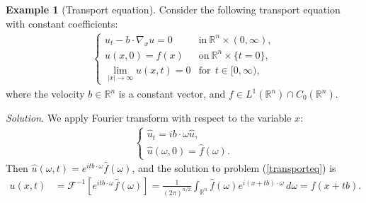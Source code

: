 \documentclass{article}
\numberwithin{equation}{section}
\newcommand{\bbR}{\mathbb{R}}
\renewcommand{\cal}{\mathcal}
\newcommand{\wh}{\widehat}
\theoremstyle{plain}
\theoremstyle{definition}
\newtheorem{example}[theorem]{Example}
\begin{document}
\begin{example}[Transport equation]
Consider the following transport equation with constant coefficients:
\begin{align}
\begin{cases}
	u_t-b\cdot\nabla_x u=0 &\mathrm{in}\ \bbR^n\times(0,\infty),\\
	u(x,0)=f(x) &\mathrm{on}\ \bbR^n\times\{t=0\},\\
	\lim_{\vert x\vert\to\infty}u(x,t)=0& \mathrm{for}\ \ t\in[0,\infty),
\end{cases}\label{transporteq}
\end{align} 
where the velocity $b\in\bbR^n$ is a constant vector, and $f\in L^1(\bbR^n)\cap C_0(\bbR^n)$.
\end{example}
\textit{\hspace{-1.5em}Solution.} We apply Fourier transform with respect to the variable $x$:
\begin{align*}
\begin{cases}
	\wh{u}_t=ib\cdot\omega\wh{u},\\
	\wh{u}(\omega,0)=\wh{f}(\omega).
\end{cases}
\end{align*}
Then $\wh{u}(\omega,t)=e^{itb\cdot\omega}\wh{f}(\omega)$, and the solution to problem (\ref{transporteq}) is
\begin{align*}
	u(x,t)&=\cal{F}^{-1}\left[e^{itb\cdot\omega}\wh{f}(\omega)\right]=\frac{1}{(2\pi)^{n/2}}\int_{\bbR^n}\wh{f}(\omega) e^{i(x+tb)\cdot\omega}\,d\omega=f(x+tb).\tag*{\qed}
\end{align*}
\end{document}
